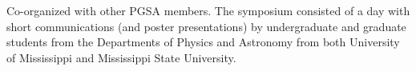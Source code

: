 \documentclass[11pt]{article}
\renewcommand{\section}[1]{\pagebreak[3]%
    \vspace{1.3\baselineskip}%
    \phantomsection\addcontentsline{toc}{section}{#1}%
    \noindent\llap{\scshape\smash{\parbox[t]{\marginparwidth}{\hyphenpenalty=10000\raggedright #1}}}%
    \vspace{-\baselineskip}\par}
\begin{document}
\begin{innerlist}
    \item Co-organized with other PGSA members.
    The symposium consisted of a day with short communications (and poster presentations)
    by undergraduate and graduate students from the Departments of Physics
    and Astronomy from both University of Mississippi and Mississippi State
    University.
\end{innerlist}





\end{document}
